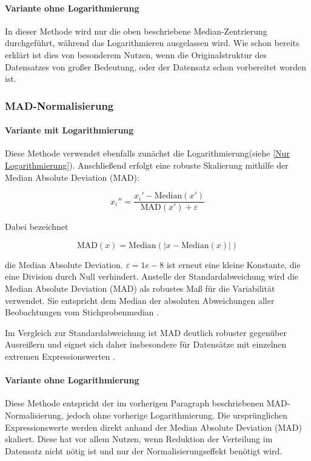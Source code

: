 \documentclass[12pt]{article}
\begin{document}
\paragraph{Variante ohne Logarithmierung}

In dieser Methode wird nur die oben beschriebene Median-Zentrierung durchgeführt, während das Logarithmieren ausgelassen wird. Wie schon bereits erklärt ist dies von besonderem Nutzen, wenn die Originalstruktur des Datensatzes von großer Bedeutung, oder der Datensatz schon vorbereitet worden ist.

\subsubsection{MAD-Normalisierung}
\label{MAD-Normalisierung}

\paragraph{Variante mit Logarithmierung}

Diese Methode verwendet ebenfalls zunächst die Logarithmierung(siehe \ref{Nur Logarithmierung}). Anschließend erfolgt eine robuste Skalierung mithilfe der Median Absolute Deviation (MAD):

\[x_i''=\frac{x_i'-\mathrm{Median}(x')}{\mathrm{MAD}(x')+\varepsilon}\]

Dabei bezeichnet

\[\mathrm{MAD}(x)=\mathrm{Median}\left(\left|x-\mathrm{Median}(x)\right|\right)\]

die Median Absolute Deviation. $\varepsilon= 1e-8$ ist erneut eine kleine Konstante, die eine Division durch Null verhindert.
Anstelle der Standardabweichung wird die Median Absolute Deviation (MAD) als robustes Maß für die Variabilität verwendet. Sie entspricht dem Median der absoluten Abweichungen aller Beobachtungen vom Stichprobenmedian \cite{Schmidt}.

Im Vergleich zur Standardabweichung ist MAD deutlich robuster gegenüber Ausreißern und eignet sich daher insbesondere für Datensätze mit einzelnen extremen Expressionswerten \cite{Kappal2019}.

\paragraph{Variante ohne Logarithmierung}

Diese Methode entspricht der im vorherigen Paragraph beschriebenen MAD-Normalisierung, jedoch ohne vorherige Logarithmierung. Die ursprünglichen Expressionswerte werden direkt anhand der Median Absolute Deviation (MAD) skaliert. Diese hat vor allem Nutzen, wenn Reduktion der Verteilung im Datensatz nicht nötig ist und nur der Normalisierungseffekt benötigt wird.
\end{document}

